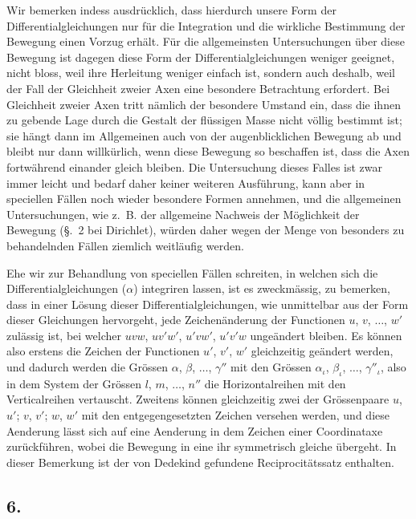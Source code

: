 \documentclass[12pt,a4paper]{article}
\begin{document}
Wir bemerken indess ausdrücklich, dass hierdurch unsere Form der Differentialgleichungen nur für die Integration und die wirkliche Bestimmung der Bewegung einen Vorzug erhält. Für die allgemeinsten Untersuchungen über diese Bewegung ist dagegen diese Form der Differentialgleichungen weniger geeignet, nicht bloss, weil ihre Herleitung weniger einfach ist, sondern auch deshalb, weil der Fall der Gleichheit zweier Axen eine besondere Betrachtung erfordert. Bei Gleichheit zweier Axen tritt nämlich der besondere Umstand ein, dass die ihnen zu gebende Lage durch die Gestalt der flüssigen Masse nicht völlig bestimmt ist; sie hängt dann im Allgemeinen auch von der augenblicklichen Bewegung ab und bleibt nur dann willkürlich, wenn diese Bewegung so beschaffen ist, dass die Axen fortwährend einander gleich bleiben. Die Untersuchung dieses Falles ist zwar immer leicht und bedarf daher keiner weiteren Ausführung, kann aber in speciellen Fällen noch wieder besondere Formen annehmen, und die allgemeinen Untersuchungen, wie z.~B. der allgemeine Nachweis der Möglichkeit der Bewegung (\S.~2 bei Dirichlet), würden daher wegen der Menge von besonders zu behandelnden Fällen ziemlich weitläufig werden.

Ehe wir zur Behandlung von speciellen Fällen schreiten, in welchen sich die Differentialgleichungen ($\alpha$) integriren lassen, ist es zweckmässig, zu bemerken, dass in einer Lösung dieser Differentialgleichungen, wie unmittelbar aus der Form dieser Gleichungen hervorgeht, jede Zeichenänderung der Functionen $u$, $v$, $\ldots$, $w'$ zulässig ist, bei welcher $uvw$, $uv'w'$, $u'vw'$, $u'v'w$ ungeändert bleiben. Es können also erstens die Zeichen der Functionen $u'$, $v'$, $w'$ gleichzeitig geändert werden, und dadurch werden die Grössen $\alpha$, $\beta$, $\ldots$, $\gamma''$ mit den Grössen $\alpha_\iota$, $\beta_\iota$, $\ldots$, $\gamma''_{\iota}$, also in dem System der Grössen $l$, $m$, $\ldots$, $n''$ die Horizontalreihen mit den Verticalreihen vertauscht. Zweitens können gleichzeitig zwei der Grössenpaare $u$, $u'$; $v$, $v'$; $w$, $w'$ mit den entgegengesetzten Zeichen versehen werden, und diese Aenderung lässt sich auf eine Aenderung in dem Zeichen einer Coordinataxe zurückführen, wobei die Bewegung in eine ihr symmetrisch gleiche übergeht. In dieser Bemerkung ist der von Dedekind gefundene Reciprocitätssatz enthalten.

\subsection*{6.}
\end{document}
